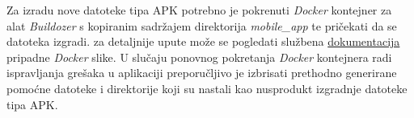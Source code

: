 \documentclass[diplomskirad]{fer}
\begin{document}
		Za izradu nove datoteke tipa APK potrebno je pokrenuti \textit{Docker} kontejner za alat \textit{Buildozer} s kopiranim sadržajem direktorija \textit{mobile\_app} te pričekati da se datoteka izgradi. za detaljnije upute može se pogledati službena \href{https://hub.docker.com/r/kivy/buildozer}{dokumentacija} pripadne \textit{Docker} slike. U slučaju ponovnog pokretanja \textit{Docker} kontejnera radi ispravljanja grešaka u aplikaciji preporučljivo je izbrisati prethodno generirane pomoćne datoteke i direktorije koji su nastali kao nusprodukt izgradnje datoteke tipa APK.
\end{document}
